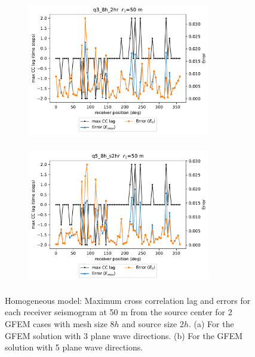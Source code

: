  \begin{figure}[h!]
 		\centering
		\begin{subfigure}{8cm}
				\includegraphics[width=8cm, height=6cm]{Thesis_Edith/figures/homo/homo_waves/Err_q3_8h_2hr_50m.pdf}
			     \caption{}
		\end{subfigure}
        \hspace{0.25cm}
		\begin{subfigure}{8cm}
				\includegraphics[width=8cm, height=6cm]{Thesis_Edith/figures/homo/homo_waves/Err_q5_8h_s2hr_50m.pdf}
			   \caption{}
		\end{subfigure}
 
	\caption{Homogeneous model: Maximum cross correlation lag and errors for each receiver seismogram at 50 m from the source center for 2 GFEM cases with mesh size $8h$ and source size $2h$. (a) For the GFEM solution with 3 plane wave directions. (b) For the GFEM solution with 5 plane wave directions.}  
	\label{fig:3.8}
\end{figure}

